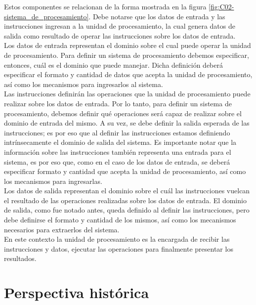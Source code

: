 Estos componentes se relacionan de la forma mostrada en la figura \ref{fig:C02-sistema_de_procesamiento}. Debe notarse que los datos de entrada y las instrucciones ingresan a la unidad de procesamiento, la cual genera datos de salida como resultado de operar las instrucciones sobre los datos de entrada.\\
Los datos de entrada representan el dominio sobre el cual puede operar la unidad de procesamiento. Para definir un sistema de procesamiento debemos especificar, entonces, cuál es el dominio que puede manejar. Dicha definición deberá especificar el formato y cantidad de datos que acepta la unidad de procesamiento, así como los mecanismos para ingresarlos al sistema.\\
Las instrucciones definirán las operaciones que la unidad de procesamiento puede realizar sobre los datos de entrada. Por lo tanto, para definir un sistema de procesamiento, debemos definir qué operaciones será capaz de realizar sobre el dominio de entrada del mismo. A su vez, se debe definir la salida esperada de las instrucciones; es por eso que al definir las instrucciones estamos definiendo intrínsecamente el dominio de salida del sistema. Es importante notar que la información sobre las instrucciones también representa una entrada para el sistema, es por eso que, como en el caso de los datos de entrada, se deberá especificar formato y cantidad que acepta la unidad de procesamiento, así como los mecanismos para ingresarlas.\\
Los datos de salida representan el dominio sobre el cuál las instrucciones vuelcan el resultado de las operaciones realizadas sobre los datos de entrada. El dominio de salida, como fue notado antes, queda definido al definir las instrucciones, pero debe definirse el formato y cantidad de los mismos, así como los mecanismos necesarios para extraerlos del sistema.\\
En este contexto la unidad de procesamiento es la encargada de recibir las instrucciones y datos, ejecutar las operaciones para finalmente presentar los resultados.\\

\section{Perspectiva histórica}

